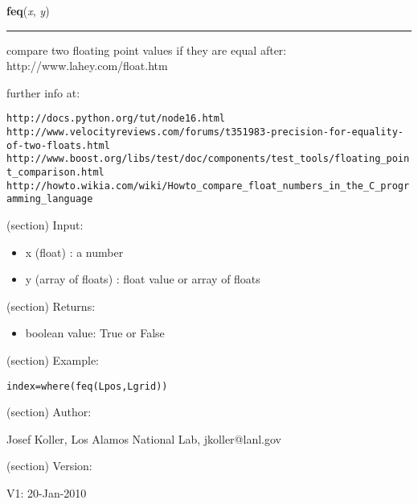     \label{spacepy:toolbox:feq}

    \vspace{0.5ex}

\hspace{.8\funcindent}\begin{boxedminipage}{\funcwidth}

    \raggedright \textbf{feq}(\textit{x}, \textit{y})

    \vspace{-1.5ex}

    \rule{\textwidth}{0.5\fboxrule}
\setlength{\parskip}{2ex}
    compare two floating point values if they are equal after: 
    http://www.lahey.com/float.htm

    further info at:

\begin{alltt}
   http://docs.python.org/tut/node16.html
   http://www.velocityreviews.com/forums/t351983-precision-for-equality-of-two-floats.html
   http://www.boost.org/libs/test/doc/components/test\_tools/floating\_point\_comparison.html
   http://howto.wikia.com/wiki/Howto\_compare\_float\_numbers\_in\_the\_C\_programming\_language\end{alltt}

    (section) Input:

      \begin{itemize}
      \setlength{\parskip}{0.6ex}
        \item x (float) : a number

        \item y (array of floats) : float value or array of floats

      \end{itemize}

    (section) Returns:

      \begin{itemize}
      \setlength{\parskip}{0.6ex}
        \item boolean value: True or False

      \end{itemize}

    (section) Example:

\begin{alltt}
\pysrcprompt{{\textgreater}{\textgreater}{\textgreater} }index = where( feq(Lpos,Lgrid) ) \end{alltt}
    (section) Author:

      Josef Koller, Los Alamos National Lab, jkoller@lanl.gov

    (section) Version:

      V1: 20-Jan-2010

\setlength{\parskip}{1ex}
    \end{boxedminipage}

